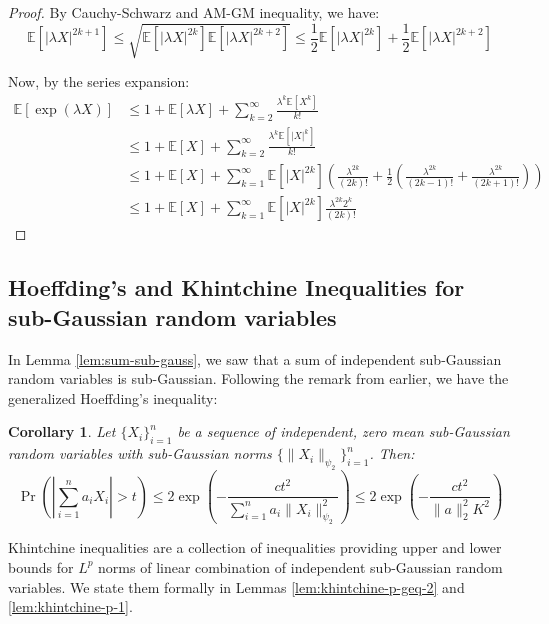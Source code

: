 \documentclass{article}
\newtheorem{corollary}{Corollary}[subsection]
\theoremstyle{remark}
\newcommand{\Exp}{\mathbb{E}}
\begin{document}
\begin{proof}
By Cauchy-Schwarz and AM-GM inequality, we have:
\begin{equation*}
\Exp[|\lambda X|^{2k + 1}] \leq \sqrt{\Exp[|\lambda X|^{2k}] \Exp[|\lambda X|^{2k + 2}]} \leq \frac{1}{2}\Exp[|\lambda X|^{2k}] + \frac{1}{2}\Exp[|\lambda X|^{2k + 2}]
\end{equation*}

Now, by the series expansion:
\begin{align*}
\Exp[\exp(\lambda X)] &\leq 1 + \Exp[\lambda X] + \sum_{k=2}^{\infty} \frac{\lambda^{k} \Exp[X^{k}]}{k!} \\
&\leq 1 + \Exp[X] + \sum_{k=2}^{\infty} \frac{\lambda^{k} \Exp[|X|^{k}]}{k!} \\
&\leq 1 + \Exp[X] + \sum_{k=1}^{\infty} \Exp[|X|^{2k}]\left(\frac{\lambda^{2k}}{(2k)!} + \frac{1}{2}\left(\frac{\lambda^{2k}}{(2k - 1)!} + \frac{\lambda^{2k}}{(2k + 1)!}\right)\right) \\
&\leq 1 + \Exp[X] + \sum_{k=1}^{\infty} \Exp[|X|^{2k}]\frac{\lambda^{2k}2^{k}}{(2k)!}
\end{align*}
\end{proof}

\subsection{Hoeffding's and Khintchine Inequalities for sub-Gaussian random variables}
In Lemma \ref{lem:sum-sub-gauss}, we saw that a sum of independent sub-Gaussian random variables is sub-Gaussian. Following the remark from earlier, we have the generalized Hoeffding's inequality:
\begin{corollary}
\label{cor:hoeffding-sub-gaussian}
Let \(\{X_{i}\}_{i=1}^{n}\) be a sequence of independent, zero mean sub-Gaussian random variables with sub-Gaussian norms \(\{\|X_{i}\|_{\psi_{2}}\}_{i=1}^{n}\). Then:
\begin{equation*}
\Pr\left(\left|\sum_{i=1}^{n} a_{i}X_{i}\right| > t\right) \leq 2\exp\left(-\frac{ct^{2}}{\sum\limits_{i=1}^{n}a_{i}\|X_{i}\|_{\psi_{2}}^{2}}\right) \leq 2\exp\left(-\frac{ct^{2}}{\|a\|_{2}^{2}K^{2}}\right)
\end{equation*}
\end{corollary}

Khintchine inequalities are a collection of inequalities providing upper and lower bounds for \(L^{p}\) norms of linear combination of independent sub-Gaussian random variables. We state them formally in Lemmas \ref{lem:khintchine-p-geq-2} and \ref{lem:khintchine-p-1}.
\end{document}
